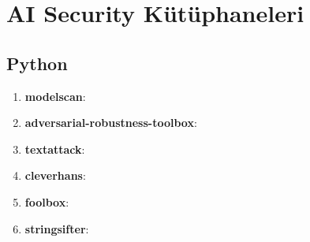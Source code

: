 \section{AI Security Kütüphaneleri}

\subsection{Python}
\begin{enumerate}
    \item \textbf{modelscan}:
    \item \textbf{adversarial-robustness-toolbox}:
    \item \textbf{textattack}:
    \item \textbf{cleverhans}:
    \item \textbf{foolbox}:
    \item \textbf{stringsifter}:
\end{enumerate}

\newpage